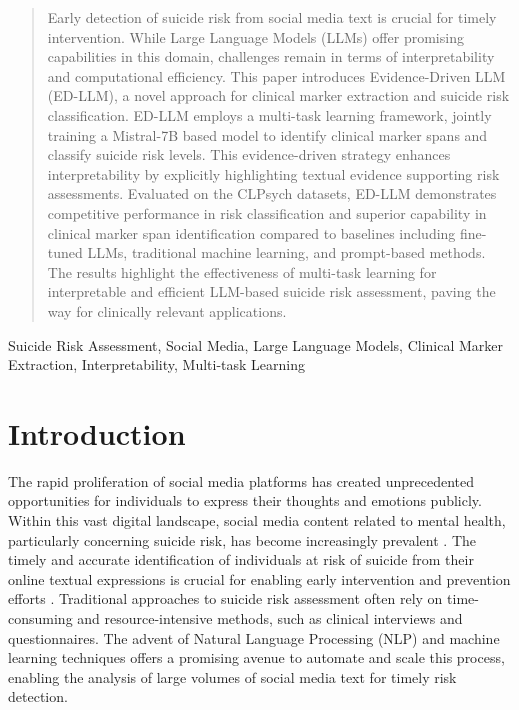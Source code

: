 \begin{abstract}
Early detection of suicide risk from social media text is crucial for timely intervention. While Large Language Models (LLMs) offer promising capabilities in this domain, challenges remain in terms of interpretability and computational efficiency. This paper introduces Evidence-Driven LLM (ED-LLM), a novel approach for clinical marker extraction and suicide risk classification. ED-LLM employs a multi-task learning framework, jointly training a Mistral-7B based model to identify clinical marker spans and classify suicide risk levels. This evidence-driven strategy enhances interpretability by explicitly highlighting textual evidence supporting risk assessments.  Evaluated on the CLPsych datasets, ED-LLM demonstrates competitive performance in risk classification and superior capability in clinical marker span identification compared to baselines including fine-tuned LLMs, traditional machine learning, and prompt-based methods.  The results highlight the effectiveness of multi-task learning for interpretable and efficient LLM-based suicide risk assessment, paving the way for clinically relevant applications.
\end{abstract}

\begin{IEEEkeywords}
Suicide Risk Assessment, Social Media, Large Language Models, Clinical Marker Extraction, Interpretability, Multi-task Learning
\end{IEEEkeywords}

\section{Introduction}
The rapid proliferation of social media platforms has created unprecedented opportunities for individuals to express their thoughts and emotions publicly. Within this vast digital landscape, social media content related to mental health, particularly concerning suicide risk, has become increasingly prevalent \cite{DeChoudhury2013}. The timely and accurate identification of individuals at risk of suicide from their online textual expressions is crucial for enabling early intervention and prevention efforts \cite{Wong2019}. Traditional approaches to suicide risk assessment often rely on time-consuming and resource-intensive methods, such as clinical interviews and questionnaires. The advent of Natural Language Processing (NLP) and machine learning techniques offers a promising avenue to automate and scale this process, enabling the analysis of large volumes of social media text for timely risk detection.

